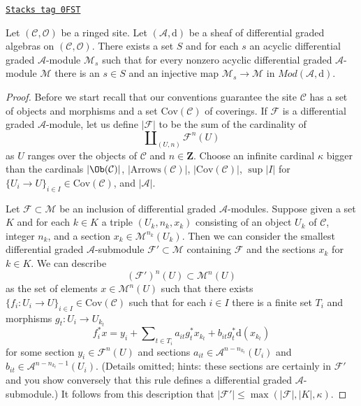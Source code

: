 \begin{lemma}
\label{sdga-lemma-small-acyclics}
\href{https://stacks.math.columbia.edu/tag/0FST}{\texttt{Stacks tag 0FST}}

Let $(\mathcal{C}, \mathcal{O})$ be a ringed site.
Let $(\mathcal{A}, \text{d})$ be a sheaf of differential graded algebras
on $(\mathcal{C}, \mathcal{O})$. There exists a set $S$ and for each $s$
an acyclic differential graded $\mathcal{A}$-module $\mathcal{M}_s$ such
that for every nonzero acyclic differential graded $\mathcal{A}$-module
$\mathcal{M}$ there is an $s \in S$ and an injective map
$\mathcal{M}_s \to \mathcal{M}$ in $\textit{Mod}(\mathcal{A}, \text{d})$.
\end{lemma}

\begin{proof}
Before we start recall that our conventions guarantee the site $\mathcal{C}$
has a set of objects and morphisms and a set $\text{Cov}(\mathcal{C})$
of coverings.
If $\mathcal{F}$
is a differential graded $\mathcal{A}$-module, let us define $|\mathcal{F}|$
to be the sum of the cardinality of
$$
\coprod\nolimits_{(U, n)} \mathcal{F}^n(U)
$$
as $U$ ranges over the objects of $\mathcal{C}$ and $n \in \mathbf{Z}$.
Choose an infinite cardinal $\kappa$ bigger than
the cardinals $|\Ob(\mathcal{C})|$, $|\text{Arrows}(\mathcal{C})|$,
$|\text{Cov}(\mathcal{C})|$, $\sup |I|$ for
$\{U_i \to U\}_{i \in I} \in \text{Cov}(\mathcal{C})$,
and $|\mathcal{A}|$.

\medskip\noindent
Let $\mathcal{F} \subset \mathcal{M}$ be an inclusion of
differential graded $\mathcal{A}$-modules.
Suppose given a set $K$ and for each $k \in K$ a triple
$(U_k, n_k, x_k)$ consisting of an object $U_k$ of $\mathcal{C}$,
integer $n_k$, and a section $x_k \in \mathcal{M}^{n_k}(U_k)$.
Then we can consider the smallest differential graded
$\mathcal{A}$-submodule $\mathcal{F}' \subset \mathcal{M}$
containing $\mathcal{F}$ and the sections $x_k$ for $k \in K$.
We can describe
$$
(\mathcal{F}')^n(U) \subset \mathcal{M}^n(U)
$$
as the set of elements $x \in \mathcal{M}^n(U)$ such that there
exists $\{f_i : U_i \to U\}_{i \in I} \in \text{Cov}(\mathcal{C})$ such that
for each $i \in I$ there is a finite set $T_i$ and morphisms
$g_t : U_i \to U_{k_t}$
$$
f_i^*x = y_i +
\sum\nolimits_{t \in T_i} a_{it}g_t^*x_{k_t} + b_{it}g_t^*\text{d}(x_{k_t})
$$
for some section $y_i \in \mathcal{F}^n(U)$ and
sections $a_{it} \in \mathcal{A}^{n - n_{k_t}}(U_i)$
and $b_{it} \in \mathcal{A}^{n - n_{k_t} - 1}(U_i)$.
(Details omitted; hints: these sections are certainly in $\mathcal{F}'$
and you show conversely that this rule defines a differential
graded $\mathcal{A}$-submodule.)
It follows from this description that
$|\mathcal{F}'| \leq \max(|\mathcal{F}|, |K|, \kappa)$.


\end{proof}
